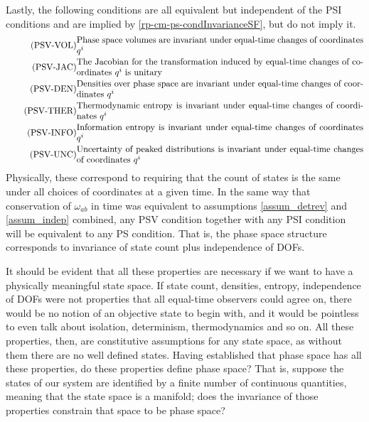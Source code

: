 Lastly, the following conditions are all equivalent but independent of the PSI conditions and are implied by \ref{rp-cm-ps-condInvarianceSF}, but do not imply it.
\begin{align}
	\tag{PSV-VOL}\label{rp-cm-psv-condInvariantVolume}
	&\eqtext{Phase space volumes are invariant under equal-time changes of coordinates $q^i$} \\
	\tag{PSV-JAC}\label{rp-cm-psv-condUnitaryJacobian}
	&\eqtext{The Jacobian for the transformation induced by equal-time changes of coordinates $q^i$ is unitary} \\
	\tag{PSV-DEN}\label{rp-cm-psv-condConservedDensities}
	&\eqtext{Densities over phase space are invariant under equal-time changes of coordinates $q^i$} \\
	\tag{PSV-THER}\label{rp-cm-psv-condInvariantEntropy}
	&\eqtext{Thermodynamic entropy is invariant under equal-time changes of coordinates $q^i$} \\
	\tag{PSV-INFO}\label{rp-cm-psv-condInvariantInformation}
	&\eqtext{Information entropy is invariant under equal-time changes of coordinates $q^i$} \\
	\tag{PSV-UNC}\label{rp-cm-psv-condInvariantUncertainty}
	&\eqtext{Uncertainty of peaked distributions is invariant under equal-time changes of coordinates $q^i$}
\end{align}
Physically, these correspond to requiring that the count of states is the same under all choices of coordinates at a given time. In the same way that conservation of $\omega_{ab}$ in time was equivalent to assumptions \ref{assum_detrev} and \ref{assum_indep} combined, any PSV condition together with any PSI condition will be equivalent to any PS condition. That is, the phase space structure corresponds to invariance of state count plus independence of DOFs.

It should be evident that all these properties are necessary if we want to have a physically meaningful state space. If state count, densities, entropy, independence of DOFs were not properties that all equal-time observers could agree on, there would be no notion of an objective state to begin with, and it would be pointless to even talk about isolation, determinism, thermodynamics and so on. All these properties, then, are constitutive assumptions for any state space, as without them there are no well defined states. Having established that phase space has all these properties, do these properties define phase space? That is, suppose the states of our system are identified by a finite number of continuous quantities, meaning that the state space is a manifold; does the invariance of those properties constrain that space to be phase space?

